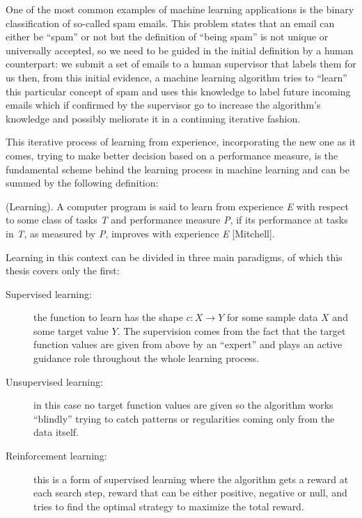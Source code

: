 One of the most common examples of machine learning applications is the binary
classification of so-called spam emails.
This problem states that an email can either be ``spam'' or not but the definition
of ``being spam'' is not unique or universally accepted, so we need to be guided
in the initial definition by a human counterpart: we submit a set of emails to a
human supervisor that labels them for us then, from this initial evidence, a
machine learning algorithm tries to ``learn'' this particular concept of spam
and uses this knowledge to label future incoming emails which if confirmed by the
supervisor go to increase the algorithm's knowledge and possibly meliorate it in
a continuing iterative fashion.

This iterative process of learning from experience, incorporating the new one
as it comes, trying to make better decision based on a performance measure, is
the fundamental scheme behind the learning process in machine learning and can
be summed by the following definition:

\begin{definition}
    (Learning). A computer program is said to learn from experience \emph{E} with
    respect to some class of tasks \emph{T} and performance measure \emph{P},
    if its performance at tasks in \emph{T}, as measured by \emph{P}, improves
    with experience \emph{E} [Mitchell].
\end{definition}

Learning in this context can be divided in three main paradigms, of which this
thesis covers only the first:
\begin{description}
    \item [Supervised learning:] the function to learn has the shape
    $c: X \to Y$ for some sample data $X$ and some target value $Y$.
    The supervision comes from the fact that the target function values are
    given from above by an ``expert'' and plays an active guidance role throughout
    the whole learning process.
    \item [Unsupervised learning:] in this case no target function values are
        given so the algorithm works ``blindly'' trying to catch patterns or
        regularities coming only from the data itself.
    \item [Reinforcement learning:] this is a form of supervised learning
        where the algorithm gets a reward at each search step, reward that can
        be either positive, negative or null, and tries to find the optimal
        strategy to maximize the total reward.
\end{description}

